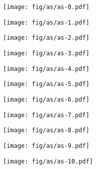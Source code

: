\documentclass{beamer}
\begin{document}
\begin{frame}
\begin{columns}[t]
  \begin{column}{6cm}
    \vspace{-0.8cm}     
    {
      \begin{figure}[h!]
        \centering
        \texttt{[image: fig/as/as-0.pdf]}
      \end{figure}
    }
    {
      \begin{figure}[h!]
        \centering
        \texttt{[image: fig/as/as-1.pdf]}
      \end{figure}
    }
    {
      \begin{figure}[h!]
        \centering
        \texttt{[image: fig/as/as-2.pdf]}
      \end{figure}
    }
    {
      \begin{figure}[h!]
        \centering
        \texttt{[image: fig/as/as-3.pdf]}
      \end{figure}
    }
    {
      \begin{figure}[h!]
        \centering
        \texttt{[image: fig/as/as-4.pdf]}
      \end{figure}
    }
    {
      \begin{figure}[h!]
        \centering
        \texttt{[image: fig/as/as-5.pdf]}
      \end{figure}
    }
    {
      \begin{figure}[h!]
        \centering
        \texttt{[image: fig/as/as-6.pdf]}
      \end{figure}
    }
    {
      \begin{figure}[h!]
        \centering
        \texttt{[image: fig/as/as-7.pdf]}
      \end{figure}
    }
    {
      \begin{figure}[h!]
        \centering
        \texttt{[image: fig/as/as-8.pdf]}
      \end{figure}
    }
    {
      \begin{figure}[h!]
        \centering
        \texttt{[image: fig/as/as-9.pdf]}
      \end{figure}
    }
    {
      \begin{figure}[h!]
        \centering
        \texttt{[image: fig/as/as-10.pdf]}
      \end{figure}
    }

  \end{column}
\end{columns} 

\end{frame}
\end{document}
